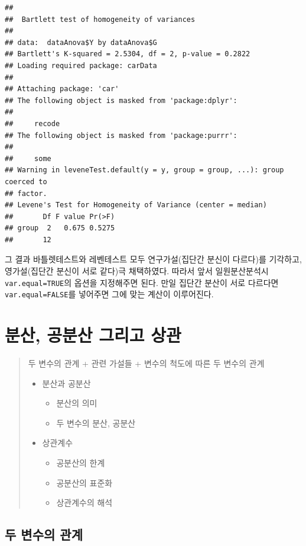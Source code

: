 \documentclass[
]{book}
\providecommand{\tightlist}{%
  \setlength{\itemsep}{0pt}\setlength{\parskip}{0pt}}
\begin{document}
\begin{verbatim}
## 
##  Bartlett test of homogeneity of variances
## 
## data:  dataAnova$Y by dataAnova$G
## Bartlett's K-squared = 2.5304, df = 2, p-value = 0.2822
## Loading required package: carData
## 
## Attaching package: 'car'
## The following object is masked from 'package:dplyr':
## 
##     recode
## The following object is masked from 'package:purrr':
## 
##     some
## Warning in leveneTest.default(y = y, group = group, ...): group coerced to
## factor.
## Levene's Test for Homogeneity of Variance (center = median)
##       Df F value Pr(>F)
## group  2   0.675 0.5275
##       12
\end{verbatim}

그 결과 바틀렛테스트와 레벤테스트 모두 연구가설(집단간 분신이 다르다)를 기각하고, 영가설(집단간 분신이 서로 같다)극 채택하였다. 따라서 앞서 일원분산분석시 \texttt{var.equal=TRUE}의 옵션을 지정해주면 된다. 만일 집단간 분산이 서로 다르다면 \texttt{var.equal=FALSE}를 넣어주면 그에 맞는 계산이 이루어진다.

\chapter{분산, 공분산 그리고 상관}\label{correlation}

\begin{quote}
두 변수의 관계
+ 관련 가설들
+ 변수의 척도에 따른 두 변수의 관계

\begin{itemize}
\tightlist
\item
  분산과 공분산

  \begin{itemize}
  \tightlist
  \item
    분산의 의미
  \item
    두 변수의 분산, 공분산
  \end{itemize}
\item
  상관계수

  \begin{itemize}
  \tightlist
  \item
    공분산의 한계
  \item
    공분산의 표준화
  \item
    상관계수의 해석
  \end{itemize}
\end{itemize}
\end{quote}

\section{두 변수의 관계}\label{uxb450-uxbcc0uxc218uxc758-uxad00uxacc4}
\end{document}
